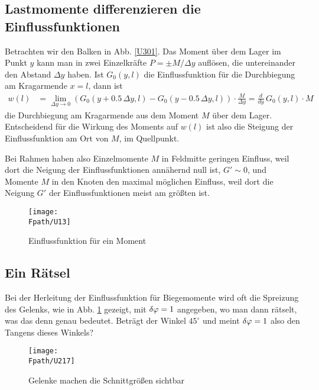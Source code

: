 {\textcolor{sectionTitleBlue}{\subsection{Lastmomente differenzieren die Einflussfunktionen}}}
Betrachten wir den Balken in Abb. \ref{U301}. Das Moment \"{u}ber dem Lager im Punkt $y$ kann man in zwei Einzelkr\"{a}fte $ P = \pm  M/\Delta y$ aufl\"{o}sen, die untereinander den Abstand $\Delta y$ haben. Ist $G_0(y,l)$ die Einflussfunktion f\"{u}r die Durchbiegung am Kragarmende $x = l$, dann ist
\begin{align}
w(l) &= \lim_{\Delta y \to 0} (G_0(y + 0.5\,\Delta y,l) - G_0(y - 0.5\,\Delta y,l)) \cdot \frac{M}{\Delta y} = \frac{d}{dy}\,G_0(y,l)\cdot M
\end{align}
die Durchbiegung am Kragarmende aus dem Moment $M$ \"{u}ber dem Lager. Entscheidend f\"{u}r die Wirkung des Moments auf $w(l)$ ist also die Steigung der Einflussfunktion am Ort von $M$, im Quellpunkt.

Bei Rahmen haben also Einzelmomente $M$ in Feldmitte geringen Einfluss, weil dort die Neigung der Einflussfunktionen ann\"{a}hernd null ist,  $G' \sim 0$, und Momente $M$ in den Knoten den maximal m\"{o}glichen Einfluss, weil dort die Neigung $G'$ der Einflussfunktionen meist am gr\"{o}{\ss}ten ist.

\begin{figure}[tbp]
\centering
\if {} \sidecaption \fi
\texttt{[image: \\Fpath/U13]}
\caption{Einflussfunktion f\"{u}r ein Moment} \label{U13}
%
\end{figure}%

{\textcolor{sectionTitleBlue}{\subsection{Ein R\"{a}tsel}}}
Bei der Herleitung der Einflussfunktion f\"{u}r Biegemomente wird oft die Spreizung des Gelenks, wie in Abb. \ref{U13} gezeigt, mit $\delta \varphi = 1$ angegeben, wo man dann r\"{a}tselt, was das denn genau bedeutet. Betr\"{a}gt der Winkel $45^\circ$ und meint $\delta \varphi = 1$ also den Tangens dieses Winkels?
\begin{figure}[tbp]
\centering
\if {} \sidecaption \fi
\texttt{[image: \\Fpath/U217]}
\caption{Gelenke machen die Schnittgr\"{o}{\ss}en sichtbar} \label{U217}
\end{figure}%

